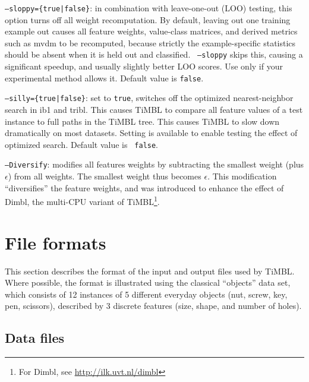 \documentclass{book}
\begin{document}
\begin{description}
\item {\tt --sloppy=\{true|false\}}: in combination with leave-one-out
  (LOO) testing, this option turns off all weight recomputation. By
  default, leaving out one training example out causes all feature
  weights, value-class matrices, and derived metrics such as {\sc
    mvdm} to be recomputed, because strictly the example-specific
  statistics should be absent when it is held out and classified. {\tt
    --sloppy} skips this, causing a significant speedup, and usually
  slightly better LOO scores. Use only if your experimental method
  allows it. Default value is {\tt false}.
\item {\tt --silly=\{true|false\}}: set to {\tt true}, switches off
  the optimized nearest-neighbor search in {\sc ib1} and {\sc
    tribl}. This causes TiMBL to compare all feature values of a test
  instance to full paths in the TiMBL tree. This causes TiMBL to slow
  down dramatically on most datasets. Setting is available to enable
  testing the effect of optimized search. Default value is {\tt
    false}.
\item{\tt --Diversify}: modifies all features weights by subtracting
  the smallest weight (plus $\epsilon$) from all weights. The smallest
  weight thus becomes $\epsilon$. This modification ``diversifies''
  the feature weights, and was introduced to enhance the effect of
  {\sc Dimbl}, the multi-CPU variant of TiMBL\footnote{For {\sc
      Dimbl}, see \url{http://ilk.uvt.nl/dimbl}}.
\end{description}

\section{File formats}
\label{fileformats}

This section describes the format of the input and output files used
by TiMBL. Where possible, the format is illustrated using the
classical ``objects'' data set, which consists of 12 instances of 5
different everyday objects (nut, screw, key, pen, scissors), described
by 3 discrete features (size, shape, and number of holes).

\subsection{Data files}
\label{dataformats}
\end{document}
